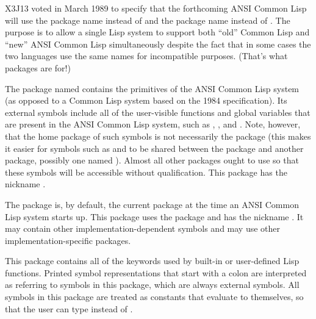 \begin{newer}
X3J13 voted in March 1989  to specify that
the forthcoming ANSI Common Lisp will use the package name 
instead of  and the package name 
instead of .  The purpose is to allow a single Lisp system
to support both ``old'' Common Lisp and ``new'' ANSI Common Lisp
simultaneously despite the fact that in some cases
the two languages use the same
names for incompatible purposes.  (That's what packages are for!)

\begin{flushdesc}
\item[\cdf{common-lisp}]
The package named  contains the primitives of the
ANSI Common Lisp system (as opposed to a Common Lisp system based
on the 1984 specification).  Its external symbols include all of the
user-visible functions and global variables that are present in the
ANSI Common Lisp system, such as , , and .
Note, however, that the home package of such symbols is not
necessarily the  package (this makes it easier for
symbols such as  and  to be shared between
the  package and another package, possibly one named ).
Almost all other packages ought to use  so that these
symbols will be accessible without qualification.
This package has the nickname .

\item[\cdf{common-lisp-user}]
The  package is, by default,
the current package at the time an ANSI Common Lisp system starts up.
This package uses the  package
and has the nickname .
It may contain other implementation-dependent symbols
and may use other implementation-specific packages.
\end{flushdesc}
\end{newer}

\begin{flushdesc}
\item[\cdf{keyword}]
This package contains all of the keywords used by built-in
or user-defined Lisp functions.  Printed symbol representations
that start with a colon are interpreted as referring to symbols
in this package, which are always external symbols.  All symbols in this
package are treated as constants that evaluate to themselves, so that the
user can type  instead of .
\end{flushdesc}

